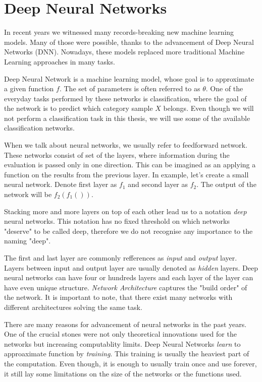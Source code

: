 \section{Deep Neural Networks}

In recent years we witnessed many records-breaking new machine learning models. Many of those were possible, thanks to the advancement of Deep Neural Networks (DNN). Nowadays, these models replaced more traditional Machine Learning approaches in many tasks.

Deep Neural Network is a machine learning model, whose goal is to approximate a given function \(f\). The set of parameters is often referred to as \(\theta\). One of the everyday tasks performed by these networks is classification, where the goal of the network is to predict which category sample \(X\) belongs. Even though we will not perform a classification task in this thesis, we will use some of the available classification networks.

When we talk about neural networks, we usually refer to feedforward network. These networks consist of set of the layers, where information during the evaluation is passed only in one direction. This can be imagined as an applying a function on the results from the previous layer. In example, let's create a small neural network. Denote first layer as \(f_1\) and second layer as \(f_2\). The output of the network will be \(f_2\left(f_1\left(\right)\right)\).

Stacking more and more layers on top of each other lead us to a notation \emph{deep} neural networks. This notation has no fixed threshold on which networks "deserve" to be called deep, therefore we do not recognise any importance to the naming "deep". 

The first and last layer are commonly refferences as \emph{input} and \emph{output} layer. Layers between input and output layer are usually denoted as \emph{hidden} layers. Deep neural networks can have four or hundreds layers and each layer of the layer can have even unique structure. \emph{Network Architecture} captures the "build order" of the network. It is important to note, that there exist many networks with different architectures solving the same task.

There are many reasons for advancement of neural networks in the past years. One of the crucial stones were not only theoretical innovations used for the networks but increasing computablity limits. Deep Neural Networks \emph{learn} to approaximate function by \emph{training}. This training is usually the heaviest part of the computation. Even though, it is enough to usually train once and use forever, it still lay some limitations on the size of the networks or the functions used.


